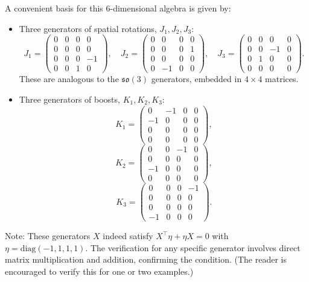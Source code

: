 \documentclass{amsart}
\theoremstyle{definition}
\theoremstyle{remark}
\begin{document}
A convenient basis for this 6-dimensional algebra is given by:
\begin{itemize}
    \item Three generators of spatial rotations, $J_1, J_2, J_3$:
    \begin{equation*} 
      J_1 = \begin{pmatrix} 0&0&0&0 \\ 0&0&0&0 \\ 0&0&0&-1 \\ 0&0&1&0 \end{pmatrix}, \quad
      J_2 = \begin{pmatrix} 0&0&0&0 \\ 0&0&0&1 \\ 0&0&0&0 \\ 0&-1&0&0 \end{pmatrix}, \quad
      J_3 = \begin{pmatrix} 0&0&0&0 \\ 0&0&-1&0 \\ 0&1&0&0 \\ 0&0&0&0 \end{pmatrix}.
    \end{equation*}
    These are analogous to the $\mathfrak{so}(3)$ generators, embedded in $4 \times 4$ matrices.
    \item Three generators of boosts, $K_1, K_2, K_3$:
    \begin{equation*} 
      K_1 = \begin{pmatrix} 0&-1&0&0 \\ -1&0&0&0 \\ 0&0&0&0 \\ 0&0&0&0 \end{pmatrix},
    \end{equation*}
    \begin{equation*}
      K_2 = \begin{pmatrix} 0&0&-1&0 \\ 0&0&0&0 \\ -1&0&0&0 \\ 0&0&0&0 \end{pmatrix},
    \end{equation*}
    \begin{equation*}
      K_3 = \begin{pmatrix} 0&0&0&-1 \\ 0&0&0&0 \\ 0&0&0&0 \\ -1&0&0&0 \end{pmatrix}.
    \end{equation*}
\end{itemize}
Note: These generators $X$ indeed satisfy $X^\top \eta + \eta X = 0$ with $\eta=\mathrm{diag}(-1,1,1,1)$. The verification for any specific generator involves direct matrix multiplication and addition, confirming the condition. (The reader is encouraged to verify this for one or two examples.)
\end{document}
